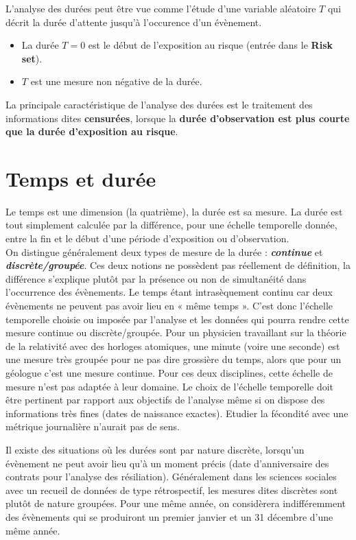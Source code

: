 \documentclass[
  12pt,
  letterpaper,
  DIV=11,
  numbers=noendperiod,
  onepage,
  openany]{scrreprt}
\providecommand{\tightlist}{%
  \setlength{\itemsep}{0pt}\setlength{\parskip}{0pt}}\usepackage{longtable,booktabs,array}
\begin{document}
L'analyse des durées peut être vue comme l'étude d'une variable
aléatoire \(T\) qui décrit la durée d'attente jusqu'à l'occurence d'un
évènement.

\begin{itemize}
\tightlist
\item
  La durée \(T=0\) est le début de l'exposition au risque (entrée dans
  le \textbf{Risk set}).
\item
  \(T\) est une mesure non négative de la durée.
\end{itemize}

La principale caractéristique de l'analyse des durées est le traitement
des informations dites \textbf{censurées}, lorsque la \textbf{durée
d'observation est plus courte que la durée d'exposition au risque}.

\hypertarget{temps-et-duruxe9e}{%
\section{\texorpdfstring{\textbf{Temps et
durée}}{Temps et durée}}\label{temps-et-duruxe9e}}

Le temps est une dimension (la quatrième), la durée est sa mesure. La
durée est tout simplement calculée par la différence, pour une échelle
temporelle donnée, entre la fin et le début d'une période d'exposition
ou d'observation.\\
On distingue généralement deux types de mesure de la durée :
\textbf{\emph{continue}} et \textbf{\emph{discrète/groupée}}. Ces deux
notions ne possèdent pas réellement de définition, la différence
s'explique plutôt par la présence ou non de simultanéité dans
l'occurrence des évènements. Le temps étant intrasèquement continu car
deux évènements ne peuvent pas avoir lieu en « même temps ». C'est donc
l'échelle temporelle choisie ou imposée par l'analyse et les données qui
pourra rendre cette mesure continue ou discrète/groupée. Pour un
physicien travaillant sur la théorie de la relativité avec des horloges
atomiques, une minute (voire une seconde) est une mesure très groupée
pour ne pas dire grossière du temps, alors que pour un géologue c'est
une mesure continue. Pour ces deux disciplines, cette échelle de mesure
n'est pas adaptée à leur domaine. Le choix de l'échelle temporelle doit
être pertinent par rapport aux objectifs de l'analyse même si on dispose
des informations très fines (dates de naissance exactes). Etudier la
fécondité avec une métrique journalière n'aurait pas de sens.

Il existe des situations où les durées sont par nature discrète,
lorsqu'un évènement ne peut avoir lieu qu'à un moment précis (date
d'anniversaire des contrats pour l'analyse des résiliation).
Généralement dans les sciences sociales avec un recueil de données de
type rétrospectif, les mesures dites discrètes sont plutôt de nature
groupées. Pour une même année, on considèrera indifféremment des
évènements qui se produiront un premier janvier et un 31 décembre d'une
même année.
\end{document}
